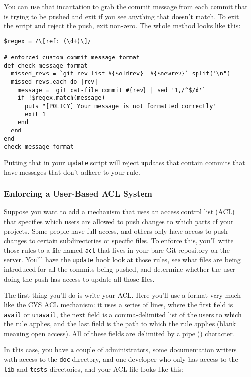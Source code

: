 \documentclass[a4paper]{book}
\begin{document}
You can use that incantation to grab the commit message from each commit that is trying to be pushed and exit if you see anything that doesn't match. To exit the script and reject the push, exit non-zero. The whole method looks like this:

\begin{shaded}\begin{verbatim}
$regex = /\[ref: (\d+)\]/

# enforced custom commit message format
def check_message_format
  missed_revs = `git rev-list #{$oldrev}..#{$newrev}`.split("\n")
  missed_revs.each do |rev|
    message = `git cat-file commit #{rev} | sed '1,/^$/d'`
    if !$regex.match(message)
      puts "[POLICY] Your message is not formatted correctly"
      exit 1
    end
  end
end
check_message_format
\end{verbatim}\end{shaded}

Putting that in your \texttt{update} script will reject updates that contain commits that have messages that don't adhere to your rule.

\subsubsection{Enforcing a User-Based ACL System}

Suppose you want to add a mechanism that uses an access control list (ACL) that specifies which users are allowed to push changes to which parts of your projects. Some people have full access, and others only have access to push changes to certain subdirectories or specific files. To enforce this, you'll write those rules to a file named \texttt{acl} that lives in your bare Git repository on the server. You'll have the \texttt{update} hook look at those rules, see what files are being introduced for all the commits being pushed, and determine whether the user doing the push has access to update all those files.

The first thing you'll do is write your ACL. Here you'll use a format very much like the CVS ACL mechanism: it uses a series of lines, where the first field is \texttt{avail} or \texttt{unavail}, the next field is a comma-delimited list of the users to which the rule applies, and the last field is the path to which the rule applies (blank meaning open access). All of these fields are delimited by a pipe (\texttt{\textbar{}}) character.

In this case, you have a couple of administrators, some documentation writers with access to the \texttt{doc} directory, and one developer who only has access to the \texttt{lib} and \texttt{tests} directories, and your ACL file looks like this:
\end{document}
